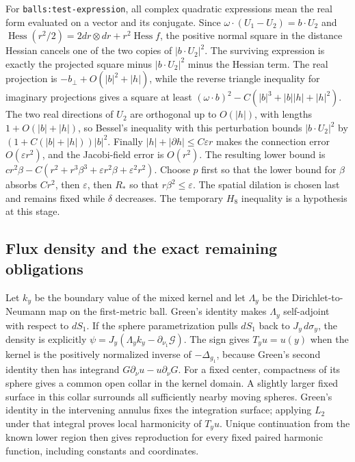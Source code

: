 \documentclass[11pt]{article}
\theoremstyle{definition}
\theoremstyle{remark}
\numberwithin{equation}{section}
\begin{document}
For \texttt{balls:test-expression}, all complex quadratic expressions
mean the real form evaluated on a vector and its conjugate. Since
$\omega\cdot(U_1-U_2)=b\cdot U_2$ and
$\operatorname{Hess}(r^2/2)=2dr\otimes dr+r^2\operatorname{Hess}f$,
the positive normal square in the distance Hessian cancels one of the
two copies of $|b\cdot U_2|^2$. The surviving expression is exactly
the projected square minus $|b\cdot U_2|^2$ minus the Hessian term.
The real projection is $-b_\perp+O(|b|^2+|h|)$, while the reverse triangle
inequality for imaginary projections gives a square at least
$(\omega\cdot b)^2-C(|b|^3+|b||h|+|h|^2)$.
The two real directions of $U_2$ are orthogonal up to $O(|h|)$, with
lengths $1+O(|b|+|h|)$, so Bessel's inequality with this perturbation
bounds $|b\cdot U_2|^2$ by $(1+C(|b|+|h|))|b|^2$.
Finally $|h|+|\partial h|\le C\varepsilon r$ makes the connection
error $O(\varepsilon r^2)$, and the Jacobi-field error is $O(r^2)$.
The resulting lower bound is
$cr^2\beta-C(r^2+r^3\beta^3+\varepsilon r^2\beta+\varepsilon^2r^2)$.
Choose $p$ first so that the lower bound for $\beta$ absorbs $Cr^2$,
then $\varepsilon$, then $R_*$ so that $r\beta^2\le\varepsilon$.
The spatial dilation is chosen last and remains fixed while $\delta$
decreases. The temporary $H_8$ inequality is a hypothesis at this stage.

\subsection{Flux density and the exact remaining obligations}
\label{cross-expanded:flux}
Let $k_y$ be the boundary value of the mixed kernel and let $\Lambda_y$
be the Dirichlet-to-Neumann map on the first-metric ball. Green's identity
makes $\Lambda_y$ self-adjoint with respect to $dS_1$. If the sphere
parametrization pulls $dS_1$ back to $J_y\,d\sigma_y$, the density is
explicitly $\psi=J_y(\Lambda_y k_y-\partial_{\nu_1}\mathcal G)$.
The sign gives $T_yu=u(y)$ when the kernel is the positively normalized
inverse of $-\Delta_{g_1}$, because Green's second identity then has
integrand $G\partial_\nu u-u\partial_\nu G$.
For a fixed center, compactness of its sphere gives a common open collar
in the kernel domain. A slightly larger fixed surface in this collar
surrounds all sufficiently nearby moving spheres. Green's identity in
the intervening annulus fixes the integration surface; applying $L_2$
under that integral proves local harmonicity of $T_yu$. Unique continuation
from the known lower region then gives reproduction for every fixed paired
harmonic function, including constants and coordinates.
\end{document}
